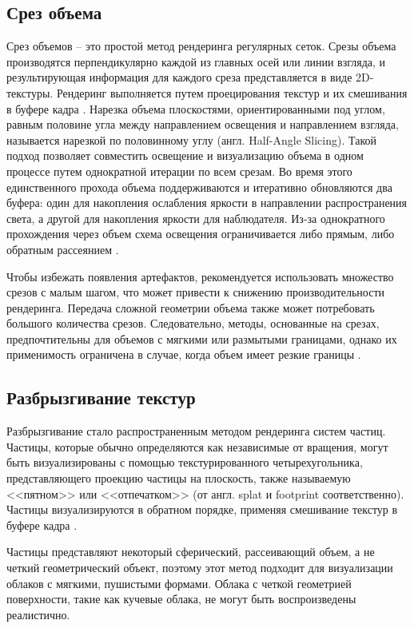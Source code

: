 \subsection{Срез объема}
\label{slice}
Срез объемов -- это простой метод рендеринга регулярных сеток. Срезы объема производятся перпендикулярно каждой из главных осей или линии взгляда, и результирующая информация для каждого среза представляется в виде 2D-текстуры. Рендеринг выполняется путем проецирования текстур и их смешивания в буфере кадра \cite{vs}. Нарезка объема плоскостями, ориентированными под углом, равным половине угла между направлением освещения и направлением взгляда, называется нарезкой по половинному углу (англ. Half-Angle Slicing). Такой подход позволяет совместить освещение и визуализацию объема в одном процессе путем однократной итерации по всем срезам. Во время этого единственного прохода объема поддерживаются и итеративно обновляются два буфера: один для накопления ослабления яркости в направлении распространения света, а другой для накопления яркости для наблюдателя. Из-за однократного прохождения через объем схема освещения ограничивается либо прямым, либо обратным рассеянием \cite{clouds}. 

Чтобы избежать появления артефактов, рекомендуется использовать множество срезов с малым шагом, что может привести к снижению производительности рендеринга. Передача сложной геометрии объема также может потребовать большого количества срезов. Следовательно, методы, основанные на срезах, предпочтительны для объемов с мягкими или размытыми границами, однако их применимость ограничена в случае, когда объем имеет резкие границы \cite{clouds}.

\subsection{Разбрызгивание текстур}
\label{splatting}
Разбрызгивание стало распространенным методом рендеринга систем частиц. Частицы, которые обычно определяются как независимые от вращения, могут быть визуализированы с помощью текстурированного четырехугольника, представляющего проекцию частицы на плоскость, также называемую <<пятном>> или <<отпечатком>> (от англ. splat и footprint соответственно). Частицы визуализируются в обратном порядке, применяя смешивание текстур в буфере кадра \cite{voxel, clouds}. 

Частицы представляют некоторый сферический, рассеивающий объем, а не четкий геометрический объект, поэтому этот метод подходит для визуализации облаков с мягкими, пушистыми формами. Облака с четкой геометрией поверхности, такие как кучевые облака, не могут быть воспроизведены реалистично.



